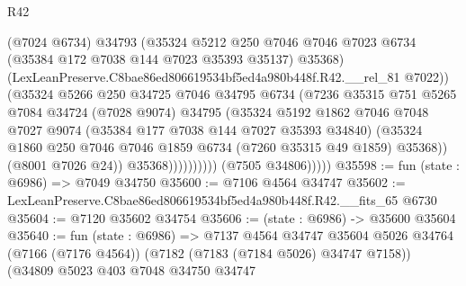 \begin{lexlean}{R42}
\begin{coremodule}
{                                (@7024 @6734)
                                @34793
                                (@35324
                                  @5212
                                  @250
                                  @7046
                                  @7046
                                  @7023
                                  @6734
                                  (@35384 @172 @7038 @144 @7023 @35393 @35137)
                                  @35368)
                                (LexLeanPreserve.C8bae86ed806619534bf5ed4a980b448f.R42.__rel_81
                                  @7022))
                              (@35324
                                @5266
                                @250
                                @34725
                                @7046
                                @34795
                                @6734
                                (@7236
                                  @35315
                                  @751
                                  @5265
                                  @7084
                                  @34724
                                  (@7028 @9074)
                                  @34795
                                  (@35324
                                    @5192
                                    @1862
                                    @7046
                                    @7048
                                    @7027
                                    @9074
                                    (@35384 @177 @7038 @144 @7027 @35393 @34840)
                                    (@35324
                                      @1860
                                      @250
                                      @7046
                                      @7046
                                      @1859
                                      @6734
                                      (@7260 @35315 @49 @1859)
                                      @35368))
                                  (@8001 @7026 @24))
                                @35368))))))))))
            (@7505 @34806)))))
@35598 := fun (state : @6986) => @7049 @34750
@35600 := @7106 @4564 @34747
@35602 := LexLeanPreserve.C8bae86ed806619534bf5ed4a980b448f.R42.__fits_65 @6730
@35604 := @7120 @35602 @34754
@35606 := (state : @6986) -> @35600 @35604
@35640 := fun (state : @6986) =>
  @7137
    @4564
    @34747
    @35604
    @5026
    @34764
    (@7166 (@7176 @4564))
    (@7182 (@7183 (@7184 @5026) @34747 @7158))
    (@34809
      @5023
      @403
      @7048
      @34750
      @34747
}
\end{coremodule}
\end{lexlean}

